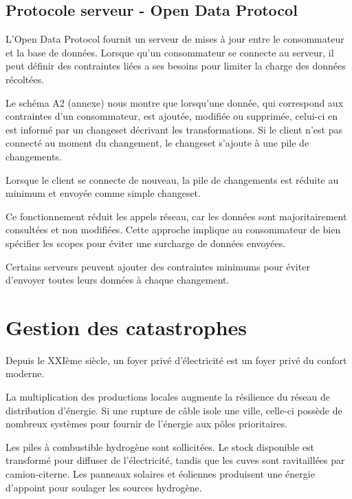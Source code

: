 \subsection{Protocole serveur - Open Data Protocol}

L'Open Data Protocol fournit un serveur de mises à jour entre le consommateur et la base de données.
Lorsque qu'un consommateur se connecte au serveur, il peut définir des contraintes liées a ses besoins
pour limiter la charge des données récoltées.

Le schéma A2 (annexe) nous montre que lorsqu'une donnée, qui correspond aux contraintes d'un consommateur, est ajoutée, modifiée ou supprimée,
celui-ci en est informé par un changeset décrivant les transformations.
Si le client n'est pas connecté au moment du changement, le changeset s'ajoute à une pile
de changements.

Lorsque le client se connecte de nouveau, la pile de changements est réduite au minimum et envoyée
comme simple changeset.

Ce fonctionnement réduit les appels réseau, car les données sont majoritairement consultées et non modifiées.
Cette approche implique au consommateur de bien spécifier les scopes pour éviter une surcharge de données
envoyées.

Certains serveurs peuvent ajouter des contraintes minimums pour éviter d'envoyer toutes leurs données
à chaque changement.



\section{Gestion des catastrophes}

Depuis le XXIème siècle, un foyer privé d'électricité est un foyer privé du confort moderne.

La multiplication des productions locales augmente la résilience du réseau de distribution d'énergie.
Si une rupture de câble isole une ville, celle-ci possède de nombreux systèmes pour fournir
de l'énergie aux pôles prioritaires.

Les piles à combustible hydrogène sont sollicitées. Le stock disponible est transformé pour diffuser de l'électricité,
tandis que les cuves sont ravitaillées par camion-citerne.
Les panneaux solaires et éoliennes produisent une énergie d'appoint pour soulager les sources hydrogène.


